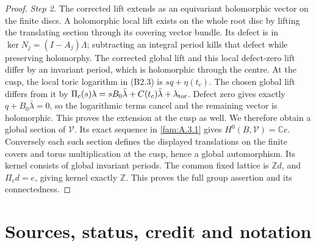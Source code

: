 \documentclass[11pt,a4paper]{article}
\theoremstyle{plain}
\theoremstyle{definition}
\begin{document}
\begin{proof}
\par\noindent\textit{Step 2.} The corrected lift extends as an equivariant holomorphic vector on the finite discs. A holomorphic local lift exists on the whole root disc by lifting the translating section through its covering vector bundle. Its defect is in $\ker N_j=(I-A_j)\Lambda$; subtracting an integral period kills that defect while preserving holomorphy. The corrected global lift and this local defect-zero lift differ by an invariant period, which is holomorphic through the centre. At the cusp, the local toric logarithm in (B2.3) is $sq+\eta(t_c)$. The chosen global lift differs from it by $\Pi_c(s)\lambda=sB_0\bar\lambda+C(t_c)\bar\lambda+\lambda_{\rm tor}$. Defect zero gives exactly $q+B_0\bar\lambda=0$, so the logarithmic terms cancel and the remaining vector is holomorphic. This proves the extension at the cusp as well. We therefore obtain a global section of $\mathcal V$. Its exact sequence in \ref{fam:A.3.1} gives $H^0(B,\mathcal V)=\mathbb Ce$. Conversely each such section defines the displayed translations on the finite covers and torus multiplication at the cusp, hence a global automorphism. Its kernel consists of global invariant periods. The common fixed lattice is $\mathbb Zd$, and $\Pi_cd=e$, giving kernel exactly $\mathbb Z$. This proves the full group assertion and its connectedness.
\end{proof}


\section{Sources, status, credit and notation}\label{app:audits}
\end{document}
